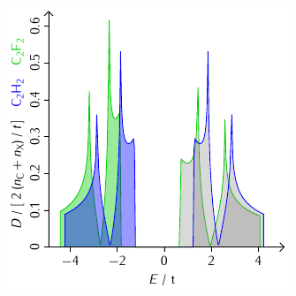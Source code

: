 \documentclass{beamer}
\begin{document}
\begin{frame}
\begin{minipage}{0.48\textwidth}
		\end{minipage}
		\hfill
		\begin{minipage}{0.48\textwidth}
			\includegraphics[width=\textwidth]{Abbildungen/Bandstrukturen/DOS_C2X2.pdf}
		\end{minipage}
	\end{frame}
	
\end{document}
